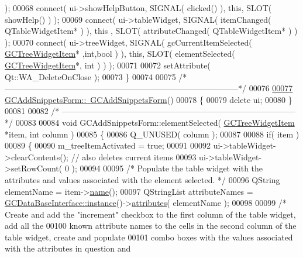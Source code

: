 \begin{DoxyCode}
      );
00068   connect( ui->showHelpButton, SIGNAL( clicked() ), \textcolor{keyword}{this}, SLOT( showHelp() ) );
00069   connect( ui->tableWidget,    SIGNAL( itemChanged( QTableWidgetItem* ) ), \textcolor{keyword}{this}
      , SLOT( attributeChanged( QTableWidgetItem* ) ) );
00070   connect( ui->treeWidget,     SIGNAL( gcCurrentItemSelected( \hyperlink{class_g_c_tree_widget_item}{GCTreeWidgetItem}*
      ,\textcolor{keywordtype}{int},\textcolor{keywordtype}{bool} ) ), \textcolor{keyword}{this}, SLOT( elementSelected( \hyperlink{class_g_c_tree_widget_item}{GCTreeWidgetItem}*, \textcolor{keywordtype}{int} ) ) );
00071 
00072   setAttribute( Qt::WA\_DeleteOnClose );
00073 \}
00074 
00075 \textcolor{comment}{/*
      --------------------------------------------------------------------------------------*/}
00076 
\hypertarget{gcaddsnippetsform_8cpp_source_l00077}{}\hyperlink{class_g_c_add_snippets_form_a3a56853da9df0a69b7dfc0de3c762d9e}{00077} \hyperlink{class_g_c_add_snippets_form_a3a56853da9df0a69b7dfc0de3c762d9e}{GCAddSnippetsForm::~GCAddSnippetsForm}()
00078 \{
00079   \textcolor{keyword}{delete} ui;
00080 \}
00081 
00082 \textcolor{comment}{/*
      --------------------------------------------------------------------------------------*/}
00083 
00084 \textcolor{keywordtype}{void} GCAddSnippetsForm::elementSelected( \hyperlink{class_g_c_tree_widget_item}{GCTreeWidgetItem} *item, \textcolor{keywordtype}{int} column )
00085 \{
00086   Q\_UNUSED( column );
00087 
00088   \textcolor{keywordflow}{if}( item )
00089   \{
00090     m\_treeItemActivated = \textcolor{keyword}{true};
00091 
00092     ui->tableWidget->clearContents();   \textcolor{comment}{// also deletes current items}
00093     ui->tableWidget->setRowCount( 0 );
00094 
00095     \textcolor{comment}{/* Populate the table widget with the attributes and values associated with
       the element selected. */}
00096     QString elementName = item->\hyperlink{class_g_c_tree_widget_item_a3af8c66a690cd55986a38b996a375ba4}{name}();
00097     QStringList attributeNames = \hyperlink{class_g_c_data_base_interface_a1baea9c0667aa8b610ec30076fcab84c}{GCDataBaseInterface::instance}()->\hyperlink{class_g_c_data_base_interface_afb1e49e08f98ca453f9ac66340a35642}{attributes}( 
      elementName );
00098 
00099     \textcolor{comment}{/* Create and add the "increment" checkbox to the first column of the table
       widget, add all the}
00100 \textcolor{comment}{    known attribute names to the cells in the second column of the table
       widget, create and populate}
00101 \textcolor{comment}{    combo boxes with the values associated with the attributes in question and
}
\end{DoxyCode}
